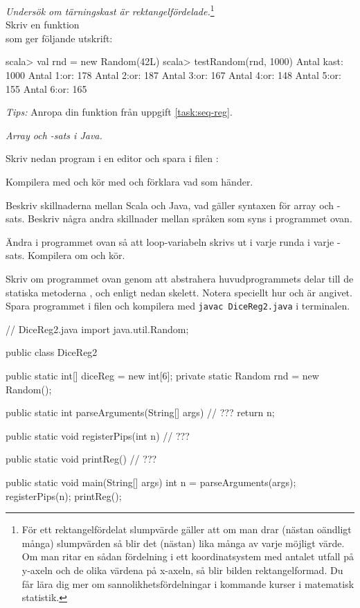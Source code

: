 \Task \emph{Undersök om tärningskast är rektangelfördelade.}\footnote{För ett rektangelfördelat slumpvärde gäller att om man drar (nästan oändligt många) slumpvärden så blir det (nästan) lika många av varje möjligt värde. Om man ritar en sådan fördelning i ett koordinatsystem med antalet utfall på y-axeln och de olika värdena på x-axeln, så blir bilden rektangelformad. Du får lära dig mer om sannolikhetsfördelningar i kommande kurser i matematisk statistik.} \\Skriv en funktion  \\ som ger följande utskrift:
\begin{REPL}
scala> val rnd = new Random(42L)
scala> testRandom(rnd, 1000)
Antal kast: 1000
Antal 1:or: 178
Antal 2:or: 187
Antal 3:or: 167
Antal 4:or: 148
Antal 5:or: 155
Antal 6:or: 165
\end{REPL}

\emph{Tips:} 
Anropa din funktion  från uppgift \ref{task:seq-reg}.


\Task \emph{Array och -sats i Java.} 

\Subtask Skriv nedan program i en editor och spara i filen :


\Subtask Kompilera med  och kör med  och förklara vad som händer.

\Subtask\Pen Beskriv skillnaderna mellan Scala och Java, vad gäller syntaxen för array och -sats. Beskriv några andra skillnader mellan språken som syns i programmet ovan.

\Subtask Ändra i programmet ovan så att loop-variabeln  skrivs ut i varje runda i varje -sats. Kompilera om och kör.

\Subtask Skriv om programmet ovan genom att abstrahera huvudprogrammets delar till de statiska metoderna ,  och  enligt nedan skelett. Notera speciellt hur  och  är angivet. Spara programmet i filen  och kompilera med \texttt{javac DiceReg2.java} i terminalen.

\begin{Code}[language=Java]
// DiceReg2.java
import java.util.Random;

public class DiceReg2 {
    public static int[] diceReg = new int[6];  
    private static Random rnd = new Random();

    public static int parseArguments(String[] args) {
        // ???
        return n;        
    }
    
    public static void registerPips(int n){
        // ???
    }
    
    public static void printReg() {
        // ???
    }

    public static void main(String[] args) {
        int n = parseArguments(args);
        registerPips(n);
        printReg();
    }
}
\end{Code}

